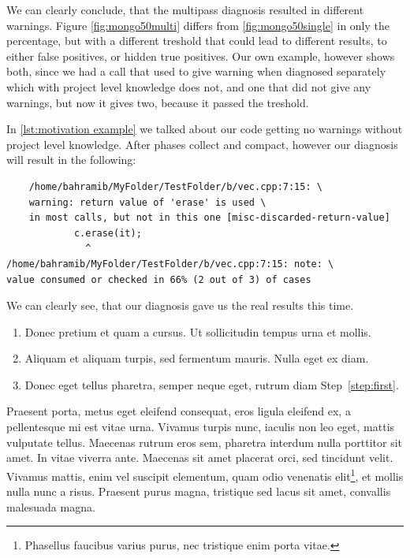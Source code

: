 We can clearly conclude, that the multipass diagnosis resulted in different warnings. Figure \cref{fig:mongo50multi}
differs from \cref{fig:mongo50single} in only the percentage, but with a different treshold that could lead to different
results, to either false positives, or hidden true positives. Our own example, however shows both, since we had a call
that used to give warning when diagnosed separately which with project level knowledge does not, and one that did not give
any warnings, but now it gives two, because it passed the treshold.

In \cref{lst:motivation example} we talked about our code getting no warnings without project level knowledge.
After phases collect and compact, however our diagnosis will result in the following:

\begin{lstlisting}
	/home/bahramib/MyFolder/TestFolder/b/vec.cpp:7:15: \
	warning: return value of 'erase' is used \
	in most calls, but not in this one [misc-discarded-return-value]
            c.erase(it);
              ^
/home/bahramib/MyFolder/TestFolder/b/vec.cpp:7:15: note: \
value consumed or checked in 66% (2 out of 3) of cases
\end{lstlisting}

We can clearly see, that our diagnosis gave us the real results this time.
















\iffalse
	\begin{enumerate}
		\item\label{step:first} Donec pretium et quam a cursus. Ut sollicitudin tempus urna et mollis.
		\item Aliquam et aliquam turpis, sed fermentum mauris. Nulla eget ex diam.
		\item Donec eget tellus pharetra, semper neque eget, rutrum diam Step~\ref{step:first}.
	\end{enumerate}

	Praesent porta, metus eget eleifend consequat, eros ligula eleifend ex, a pellentesque mi est vitae urna. Vivamus turpis nunc, iaculis non leo eget, mattis vulputate tellus. Maecenas rutrum eros sem, pharetra interdum nulla porttitor sit amet. In vitae viverra ante. Maecenas sit amet placerat orci, 
	sed tincidunt velit. Vivamus mattis, enim vel suscipit elementum, quam odio venenatis elit\footnote{Phasellus faucibus varius purus, nec tristique enim porta vitae.}, et mollis nulla nunc a risus. Praesent purus magna, tristique sed lacus sit amet, convallis malesuada magna. 

